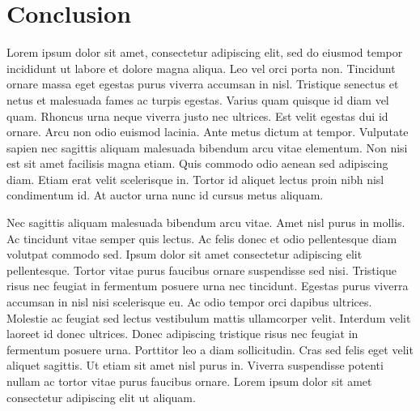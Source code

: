 \chapter{Conclusion}

Lorem ipsum dolor sit amet, consectetur adipiscing elit, sed do eiusmod tempor incididunt ut labore et dolore magna aliqua. Leo vel orci porta non. Tincidunt ornare massa eget egestas purus viverra accumsan in nisl. Tristique senectus et netus et malesuada fames ac turpis egestas. Varius quam quisque id diam vel quam. Rhoncus urna neque viverra justo nec ultrices. Est velit egestas dui id ornare. Arcu non odio euismod lacinia. Ante metus dictum at tempor. Vulputate sapien nec sagittis aliquam malesuada bibendum arcu vitae elementum. Non nisi est sit amet facilisis magna etiam. Quis commodo odio aenean sed adipiscing diam. Etiam erat velit scelerisque in. Tortor id aliquet lectus proin nibh nisl condimentum id. At auctor urna nunc id cursus metus aliquam.

Nec sagittis aliquam malesuada bibendum arcu vitae. Amet nisl purus in mollis. Ac tincidunt vitae semper quis lectus. Ac felis donec et odio pellentesque diam volutpat commodo sed. Ipsum dolor sit amet consectetur adipiscing elit pellentesque. Tortor vitae purus faucibus ornare suspendisse sed nisi. Tristique risus nec feugiat in fermentum posuere urna nec tincidunt. Egestas purus viverra accumsan in nisl nisi scelerisque eu. Ac odio tempor orci dapibus ultrices. Molestie ac feugiat sed lectus vestibulum mattis ullamcorper velit. Interdum velit laoreet id donec ultrices. Donec adipiscing tristique risus nec feugiat in fermentum posuere urna. Porttitor leo a diam sollicitudin. Cras sed felis eget velit aliquet sagittis. Ut etiam sit amet nisl purus in. Viverra suspendisse potenti nullam ac tortor vitae purus faucibus ornare. Lorem ipsum dolor sit amet consectetur adipiscing elit ut aliquam.

